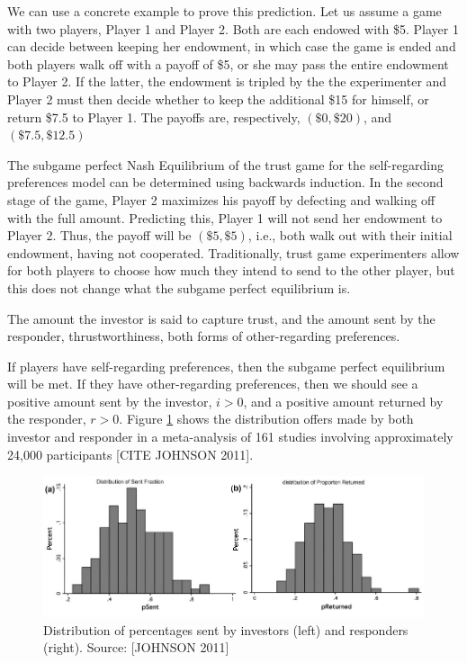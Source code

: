 \message{ !name(tese.tex)}\documentclass{article}
\begin{document}
We can use a concrete example to prove this prediction. Let us assume a game with two players, Player 1 and Player 2. Both are each endowed with \$5. Player 1 can decide between keeping her endowment, in which case the game is ended and both players walk off with a payoff of \$5, or she may pass the entire endowment to Player 2. If the latter, the endowment is tripled by the the experimenter and Player 2 must then decide whether to keep the additional \$15 for himself, or return \$7.5 to Player 1. The payoffs are, respectively, $\left( \$ 0, \$20 \right)$, and  $\left( \$ 7.5, \$12.5 \right)$


The subgame perfect Nash Equilibrium of the trust game for the self-regarding preferences model can be determined using backwards induction. In the second stage of the game, Player 2 maximizes his payoff by defecting and walking off with the full amount. Predicting this, Player 1 will not send her endowment to Player 2. Thus, the payoff will be $\left (\$5,\$5 \right)$, i.e., both walk out with their initial endowment, having not cooperated. Traditionally, trust game experimenters allow for both players to choose how much they intend to send to the other player, but this does not change what the subgame perfect equilibrium is. 

The amount the investor is said to capture trust, and the amount sent by the responder, thrustworthiness, both forms of other-regarding preferences.

If players have self-regarding preferences, then the subgame perfect equilibrium will be met. If they have other-regarding preferences, then we should see a positive amount sent by the investor, $i>0$, and a positive amount returned by the responder, $r>0$. Figure \ref{fig:turst1} shows the distribution offers made by both investor and responder in a meta-analysis of 161 studies involving approximately 24,000 participants [CITE JOHNSON 2011].
\\



\begin{figure}[h]
    \centering
    \includegraphics[width=1\textwidth]{figure_trust1.png}
    \caption{Distribution of percentages sent by investors (left) and responders (right). Source: [JOHNSON 2011]}
    \label{fig:turst1}
\end{figure}
\end{document}

